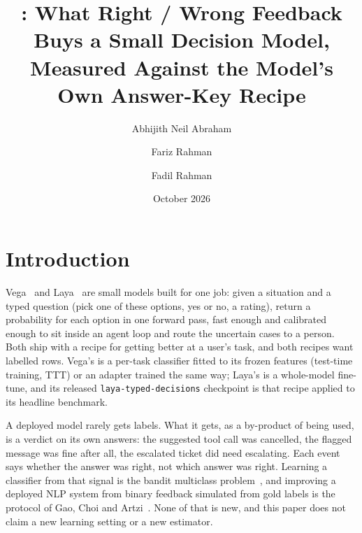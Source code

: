\documentclass[11pt]{article}
\title{\pk{}: What Right / Wrong Feedback Buys a Small Decision Model,\\Measured Against the Model's Own Answer-Key Recipe}
\author{Abhijith Neil Abraham \and Fariz Rahman \and Fadil Rahman}
\date{October 2026}
\begin{document}
\maketitle

\begin{abstract}

\end{abstract}

\section{Introduction}

Vega~\citep{vegaml} and Laya~\citep{laya} are small models built for one job: given a situation and a typed question (pick one of these options, yes or no, a rating), return a probability for each option in one forward pass, fast enough and calibrated enough to sit inside an agent loop and route the uncertain cases to a person. Both ship with a recipe for getting better at a user's task, and both recipes want labelled rows. Vega's is a per-task classifier fitted to its frozen features (test-time training, TTT) or an adapter trained the same way; Laya's is a whole-model fine-tune, and its released \texttt{laya-typed-decisions} checkpoint is that recipe applied to its headline benchmark.

A deployed model rarely gets labels. What it gets, as a by-product of being used, is a verdict on its own answers: the suggested tool call was cancelled, the flagged message was fine after all, the escalated ticket did need escalating. Each event says whether the answer was right, not which answer was right. Learning a classifier from that signal is the bandit multiclass problem~\citep{kakade2008banditron,crammer2011multiclass,daniely2013price}, and improving a deployed NLP system from binary feedback simulated from gold labels is the protocol of Gao, Choi and Artzi~\citep{gao2022simulating}. None of that is new, and this paper does not claim a new learning setting or a new estimator.
\end{document}
